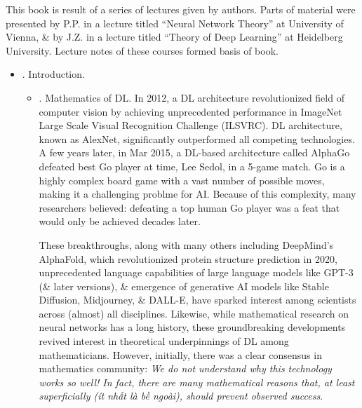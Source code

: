\documentclass{article}
\begin{document}
This book is result of a series of lectures given by authors. Parts of material were presented by P.P. in a lecture titled ``Neural Network Theory'' at University of Vienna, \& by J.Z. in a lecture titled ``Theory of Deep Learning'' at Heidelberg University. Lecture notes of these courses formed basis of book.
\begin{itemize}
	\item {. Introduction.}
	\begin{itemize}
		\item {. Mathematics of DL.} In 2012, a DL architecture revolutionized field of computer vision by achieving unprecedented performance in ImageNet Large Scale Visual Recognition Challenge (ILSVRC). DL architecture, known as AlexNet, significantly outperformed all competing technologies. A few years later, in Mar 2015, a DL-based architecture called AlphaGo defeated best Go player at time, {\sc Lee Sedol}, in a 5-game match. Go is a highly complex board game with a vast number of possible moves, making it a challenging problme for AI. Because of this complexity, many researchers believed: defeating a top human Go player was a feat that would only be achieved decades later.

		These breakthroughs, along with many others including DeepMind's AlphaFold, which revolutionized protein structure prediction in 2020, unprecedented language capabilities of large language models like GPT-3 (\& later versions), \& emergence of generative AI models like Stable Diffusion, Midjourney, \& DALL-E, have sparked interest among scientists across (almost) all disciplines. Likewise, while mathematical research on neural networks has a long history, these groundbreaking developments revived interest in theoretical underpinnings of DL among mathematicians. However, initially, there was a clear consensus in mathematics community: {\it We do not understand why this technology works so well! In fact, there are many mathematical reasons that, at least superficially (ít nhất là bề ngoài), should prevent observed success}.


\end{itemize}
\end{itemize}
\end{document}
